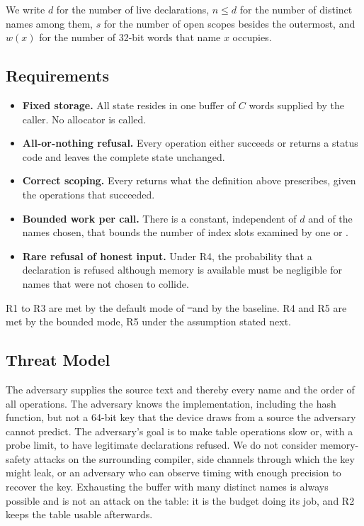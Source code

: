 We write $d$ for the number of live declarations, $n \le d$ for the number of distinct names among them, $s$ for the number of open scopes besides the outermost, and $w(x)$ for the number of 32-bit words that name $x$ occupies.

\subsection{Requirements}
\label{sec:requirements}
\begin{itemize}
\item[R1] \textbf{Fixed storage.} All state resides in one buffer of $C$ words supplied by the caller. No allocator is called.
\item[R2] \textbf{All-or-nothing refusal.} Every operation either succeeds or returns a status code and leaves the complete state unchanged.
\item[R3] \textbf{Correct scoping.} Every  returns what the definition above prescribes, given the operations that succeeded.
\item[R4] \textbf{Bounded work per call.} There is a constant, independent of $d$ and of the names chosen, that bounds the number of index slots examined by one  or .
\item[R5] \textbf{Rare refusal of honest input.} Under R4, the probability that a declaration is refused although memory is available must be negligible for names that were not chosen to collide.
\end{itemize}
R1 to R3 are met by the default mode of \st\ and by the baseline. R4 and R5 are met by the bounded mode, R5 under the assumption stated next.

\subsection{Threat Model}
\label{sec:threat}
The adversary supplies the source text and thereby every name and the order of all operations. The adversary knows the implementation, including the hash function, but not a 64-bit key that the device draws from a source the adversary cannot predict. The adversary's goal is to make table operations slow or, with a probe limit, to have legitimate declarations refused. We do not consider memory-safety attacks on the surrounding compiler, side channels through which the key might leak, or an adversary who can observe timing with enough precision to recover the key. Exhausting the buffer with many distinct names is always possible and is not an attack on the table: it is the budget doing its job, and R2 keeps the table usable afterwards.

